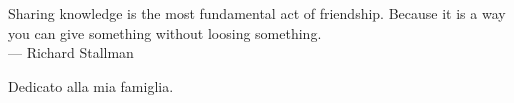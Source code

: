 
\cleardoublepage
{}
\thispagestyle{empty}

\vspace*{3cm}

\begin{center}
Sharing knowledge is the most fundamental act of friendship. Because it is a way you can give something without loosing something. \\ \medskip
--- Richard Stallman    
\end{center}

\medskip

\begin{center}
Dedicato alla mia famiglia.
\end{center}
